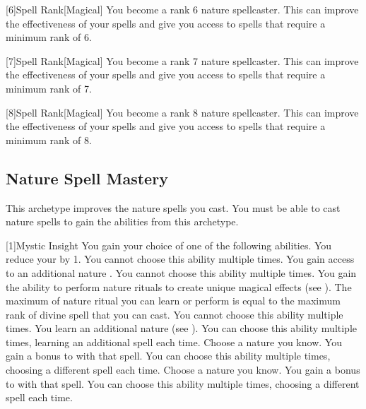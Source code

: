         [6]{Spell Rank}[Magical] You become a rank 6 nature spellcaster.
        This can improve the effectiveness of your spells and give you access to spells that require a minimum rank of 6.

        [7]{Spell Rank}[Magical] You become a rank 7 nature spellcaster.
        This can improve the effectiveness of your spells and give you access to spells that require a minimum rank of 7.

        [8]{Spell Rank}[Magical] You become a rank 8 nature spellcaster.
        This can improve the effectiveness of your spells and give you access to spells that require a minimum rank of 8.

    \subsection{Nature Spell Mastery}
        This archetype improves the nature spells you cast.
        You must be able to cast nature spells to gain the abilities from this archetype.

        [1]{Mystic Insight}
        You gain your choice of one of the following abilities.
        {
             You reduce your  by 1.
                You cannot choose this ability multiple times.
             You gain access to an additional nature .
                You cannot choose this ability multiple times.
             You gain the ability to perform nature rituals to create unique magical effects (see ).
                The maximum  of nature ritual you can learn or perform is equal to the maximum rank of divine spell that you can cast.
                You cannot choose this ability multiple times.
             You learn an additional nature  (see ).
                You can choose this ability multiple times, learning an additional spell each time.
             Choose a nature  you know.
                You gain a  bonus to  with that spell.
                You can choose this ability multiple times, choosing a different spell each time.
             Choose a nature  you know.
                You gain a  bonus to  with that spell.
                You can choose this ability multiple times, choosing a different spell each time.
        }

